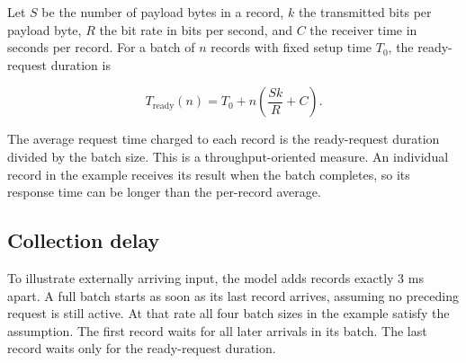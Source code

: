 Let $S$ be the number of payload bytes in a record, $k$ the transmitted bits per payload byte, $R$ the bit rate in bits per second, and $C$ the receiver time in seconds per record. For a batch of $n$ records with fixed setup time $T_0$, the ready-request duration is

\begin{equation}
T_{\mathrm{ready}}(n)=T_0+n\left(\frac{Sk}{R}+C\right).
\label{eq:latency}
\end{equation}

The average request time charged to each record is the ready-request duration divided by the batch size. This is a throughput-oriented measure. An individual record in the example receives its result when the batch completes, so its response time can be longer than the per-record average.

\subsection{Collection delay}

To illustrate externally arriving input, the model adds records exactly 3 ms apart. A full batch starts as soon as its last record arrives, assuming no preceding request is still active. At that rate all four batch sizes in the example satisfy the assumption. The first record waits for all later arrivals in its batch. The last record waits only for the ready-request duration.
